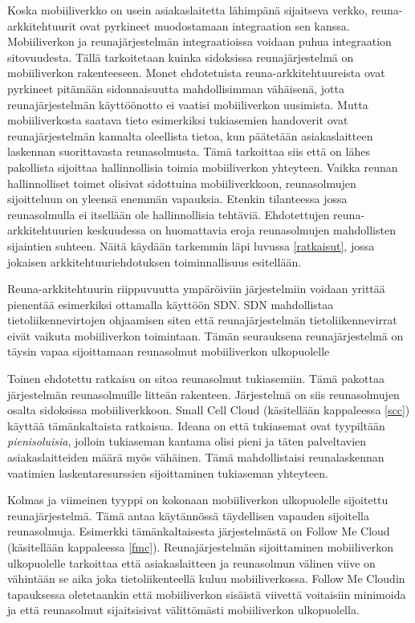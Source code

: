Koska mobiiliverkko on usein asiakaslaitetta lähimpänä sijaitseva verkko, reuna-arkkitehtuurit ovat pyrkineet muodostamaan integraation sen kanssa.
Mobiiliverkon ja reunajärjestelmän integraatioissa voidaan puhua integraation sitovuudesta. 
Tällä tarkoitetaan kuinka sidoksissa reunajärjestelmä on mobiiliverkon rakenteeseen.
Monet ehdotetuista reuna-arkkitehtuureista ovat pyrkineet pitämään sidonnaisuutta mahdollisimman vähäisenä, jotta reunajärjestelmän käyttöönotto ei vaatisi mobiiliverkon uusimista.
Mutta mobiiliverkosta saatava tieto esimerkiksi tukiasemien handoverit ovat reunajärjestelmän kannalta oleellista tietoa, kun päätetään asiakaslaitteen laskennan suorittavasta reunasolmusta.
Tämä tarkoittaa siis että on lähes pakollista sijoittaa hallinnollisia toimia mobiiliverkon yhteyteen.
Vaikka reunan hallinnolliset toimet olisivat sidottuina mobiiliverkkoon, reunasolmujen sijoitteluun on yleensä enemmän vapauksia. Etenkin tilanteessa jossa reunasolmulla ei itsellään ole hallinnollisia tehtäviä.
Ehdotettujen reuna-arkkitehtuurien keskuudessa on huomattavia eroja reunasolmujen mahdollisten sijaintien suhteen. Näitä käydään tarkemmin läpi luvussa \ref{ratkaisut}, jossa jokaisen arkkitehtuuriehdotuksen toiminnallisuus esitellään. 

Reuna-arkkitehtuurin riippuvuutta ympäröiviin järjestelmiin voidaan yrittää pienentää esimerkiksi ottamalla käyttöön SDN. SDN mahdollistaa tietoliikennevirtojen ohjaamisen siten että reunajärjestelmän tietoliikennevirrat eivät vaikuta mobiiliverkon toimintaan. Tämän seurauksena reunajärjestelmä on täysin vapaa sijoittamaan reunasolmut mobiiliverkon ulkopuolelle

Toinen ehdotettu ratkaisu on sitoa reunasolmut tukiasemiin. Tämä pakottaa järjestelmän reunasolmuille litteän rakenteen. Järjestelmä on siis reunasolmujen osalta sidoksissa mobiiliverkkoon. Small Cell Cloud (käsitellään kappaleessa \ref{scc}) käyttää tämänkaltaista ratkaisua. Ideana on että tukiasemat ovat tyypiltään \textit{pienisoluisia}, jolloin tukiaseman kantama olisi pieni ja täten palveltavien asiakaslaitteiden määrä myös vähäinen. Tämä mahdollistaisi reunalaskennan vaatimien laskentaresurssien sijoittaminen tukiaseman yhteyteen.

Kolmas ja viimeinen tyyppi on kokonaan mobiiliverkon ulkopuolelle sijoitettu reunajärjestelmä. Tämä antaa käytännössä täydellisen vapauden sijoitella reunasolmuja. Esimerkki tämänkaltaisesta järjestelmästä on Follow Me Cloud (käsitellään kappaleessa \ref{fmc}). Reunajärjestelmän sijoittaminen mobiiliverkon ulkopuolelle tarkoittaa että asiakaslaitteen ja reunasolmun välinen viive on vähintään se aika joka tietoliikenteellä kuluu mobiiliverkossa. Follow Me Cloudin tapauksessa oletetaankin että mobiiliverkon sisäistä viivettä voitaisiin minimoida ja että reunasolmut sijaitsisivat välittömästi mobiiliverkon ulkopuolella. 

















